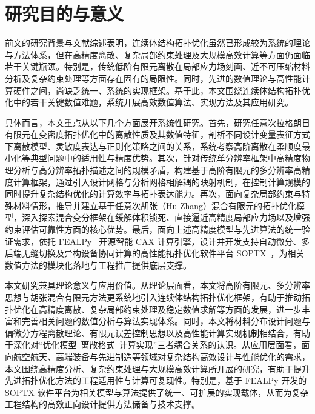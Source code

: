 

\section{研究目的与意义}
\label{sec:research_purpose_significance}

前文的研究背景与文献综述表明，连续体结构拓扑优化虽然已形成较为系统的理论与方法体系，但在高精度离散、复杂局部约束处理及大规模高效计算等方面仍面临若干关键瓶颈。特别是，传统低阶有限元离散在局部应力场刻画、近不可压缩材料分析及复杂约束处理等方面存在固有的局限性。同时，先进的数值理论与高性能计算硬件之间，尚缺乏统一、系统的实现框架。基于此，本文围绕连续体结构拓扑优化中的若干关键数值难题，系统开展高效数值算法、实现方法及其应用研究。

具体而言，本文重点从以下几个方面展开系统性研究。首先，研究任意次拉格朗日有限元在变密度拓扑优化中的离散性质及其数值特征，剖析不同设计变量表征方式下离散模型、灵敏度表达与正则化策略之间的关系，系统考察高阶离散在柔顺度最小化等典型问题中的适用性与精度优势。其次，针对传统单分辨率框架中高精度物理分析与高分辨率拓扑描述之间的规模矛盾，构建基于高阶有限元的多分辨率高精度计算框架，通过引入设计网格与分析网格相解耦的映射机制，在控制计算规模的同时提升复杂结构优化的计算效率与拓扑表达能力。再次，面向复杂局部约束与特殊材料情形，推导并建立基于任意次胡张（Hu-Zhang）混合有限元的拓扑优化模型，深入探索混合变分框架在缓解体积锁死、直接逼近高精度局部应力场以及增强约束评估可靠性方面的核心优势。最后，面向上述高精度模型与先进算法的统一验证需求，依托 FEALPy~\cite{zhengFEALPyV3Crossplatform2025a} 开源智能 CAX 计算引擎，设计并开发支持自动微分、多后端无缝切换及异构设备协同计算的高性能拓扑优化软件平台 SOPTX~\cite{heSOPTXHighperformanceMultibackend2025a}，为相关数值方法的模块化落地与工程推广提供底层支撑。

本文研究兼具理论意义与应用价值。从理论层面看，本文将高阶有限元、多分辨率思想与胡张混合有限元方法更系统地引入连续体结构拓扑优化框架，有助于推动拓扑优化在高精度离散、复杂局部约束处理及稳定数值求解等方面的发展，进一步丰富和完善相关问题的数值分析与算法实现体系。同时，本文将材料分布设计问题与偏微分方程离散理论、有限元误差控制思想以及高性能计算实现机制相结合，有助于深化对“优化模型--离散格式--计算实现”三者耦合关系的认识。从应用层面看，面向航空航天、高端装备与先进制造等领域对复杂结构高效设计与性能优化的需求，本文围绕高精度分析、复杂约束处理与大规模高效计算所开展的研究，有助于提升先进拓扑优化方法的工程适用性与计算可复现性。特别是，基于 FEALPy 开发的 SOPTX 软件平台为相关模型与算法提供了统一、可扩展的实现载体，从而为复杂工程结构的高效正向设计提供方法储备与技术支撑。

